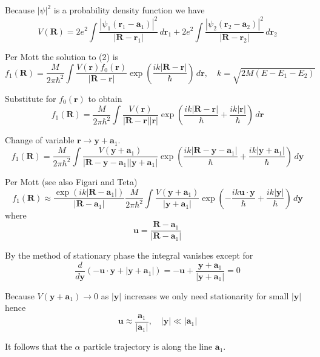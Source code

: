 \documentclass[12pt]{article}
\begin{document}
Because $|\psi|^2$ is a probability density function we have
\begin{equation*}
V(\mathbf R)
=2e^2\int\frac{|\psi_1(\mathbf r_1-\mathbf a_1)|^2}{|\mathbf R-\mathbf r_1|}
\,d\mathbf r_1
+2e^2\int\frac{|\psi_2(\mathbf r_2-\mathbf a_2)|^2}{|\mathbf R-\mathbf r_2|}
\,d\mathbf r_2
\end{equation*}

Per Mott the solution to (2) is
\begin{equation*}
f_1(\mathbf R)=
\frac{M}{2\pi\hbar^2}\int\frac{V(\mathbf r)f_0(\mathbf r)}{|\mathbf R-\mathbf r|}
\exp\left(\frac{ik|\mathbf R-\mathbf r|}{\hbar}\right)\,d\mathbf r,
\quad
k=\sqrt{2M(E-E_1-E_2)}
\end{equation*}

Substitute for $f_0(\mathbf r)$ to obtain
\begin{equation*}
f_1(\mathbf R)=
\frac{M}{2\pi\hbar^2}\int\frac{V(\mathbf r)}{|\mathbf R-\mathbf r||\mathbf r|}
\exp\left(\frac{ik|\mathbf R-\mathbf r|}{\hbar}+\frac{ik|\mathbf r|}{\hbar}\right)\,d\mathbf r
\end{equation*}

Change of variable $\mathbf r\rightarrow\mathbf y+\mathbf a_1$.
\begin{equation*}
f_1(\mathbf R)=
\frac{M}{2\pi\hbar^2}\int
\frac{V(\mathbf y+\mathbf a_1)}{|\mathbf R-\mathbf y-\mathbf a_1||\mathbf y+\mathbf a_1|}
\exp\left(\frac{ik|\mathbf R-\mathbf y-\mathbf a_1|}{\hbar}
+\frac{ik|\mathbf y+\mathbf a_1|}{\hbar}\right)\,d\mathbf y
\end{equation*}

Per Mott (see also Figari and Teta)
\begin{equation*}
f_1(\mathbf R)\approx
\frac{\exp(ik|\mathbf R-\mathbf a_1|)}{|\mathbf R-\mathbf a_1|}
\frac{M}{2\pi\hbar^2}\int\frac{V(\mathbf y+\mathbf a_1)}{|\mathbf y+\mathbf a_1|}
\exp\left(-\frac{ik\mathbf u\cdot\mathbf y}{\hbar}+\frac{ik|\mathbf y|}{\hbar}\right)\,d\mathbf y
\tag{3}
\end{equation*}
where
\begin{equation*}
\mathbf u=\frac{\mathbf R-\mathbf a_1}{|\mathbf R-\mathbf a_1|}
\end{equation*}

By the method of stationary phase the integral vanishes except for
\begin{equation*}
\frac{d}{d\mathbf y}\left(-\mathbf u\cdot\mathbf y+|\mathbf y+\mathbf a_1|\right)
=-\mathbf u+\frac{\mathbf y+\mathbf a_1}{|\mathbf y+\mathbf a_1|}=0
\end{equation*}

Because $V(\mathbf y+\mathbf a_1)\rightarrow0$ as $|\mathbf y|$ increases
we only need stationarity for small $|\mathbf y|$ hence
\begin{equation*}
\mathbf u\approx\frac{\mathbf a_1}{|\mathbf a_1|},
\quad
|\mathbf y|\ll|\mathbf a_1|
\end{equation*}

It follows that the $\alpha$ particle trajectory is along the line $\mathbf a_1$.
\end{document}

